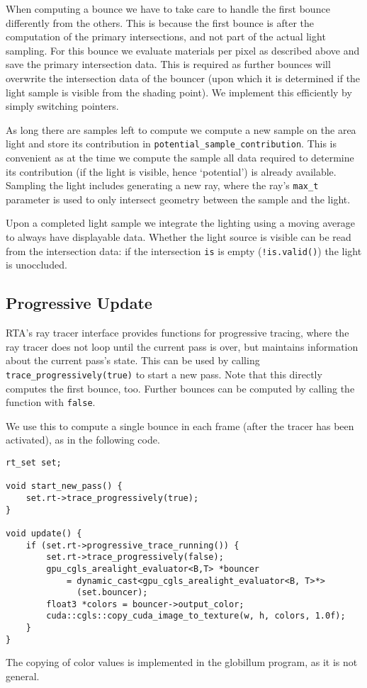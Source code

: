 \documentclass[a4paper,11pt]{scrartcl}
\begin{document}
When computing a bounce we have to take care to handle the first bounce differently from the others.
This is because the first bounce is after the computation of the primary intersections, and not part of the actual light sampling.
For this bounce we evaluate materials per pixel as described above and save the primary intersection data.
This is required as further bounces will overwrite the intersection data of the bouncer
	(upon which it is determined if the light sample is visible from the shading point).
We implement this efficiently by simply switching pointers.

As long there are samples left to compute we compute a new sample on the area light and store its contribution in 
	\lstinline|potential_sample_contribution|.
This is convenient as at the time we compute the sample all data required to determine its contribution (if the light is visible, hence `potential')
	is already available.
Sampling the light includes generating a new ray, 
	where the ray's \lstinline|max_t| parameter is used to only intersect geometry between the sample and the light.

Upon a completed light sample we integrate the lighting using a moving average to always have displayable data.
Whether the light source is visible can be read from the intersection data: if the intersection \lstinline|is| is empty (\lstinline|!is.valid()|)
	the light is unoccluded.

\subsection{Progressive Update}
RTA's ray tracer interface provides functions for progressive tracing, where the ray tracer does not loop until the current pass is over,
	but maintains information about the current pass's state.
This can be used by calling \lstinline|trace_progressively(true)| to start a new pass.
Note that this directly computes the first bounce, too.
Further bounces can be computed by calling the function with \lstinline|false|.

We use this to compute a single bounce in each frame (after the tracer has been activated), as in the following code.
\begin{lstlisting}
rt_set set;

void start_new_pass() {
	set.rt->trace_progressively(true);
}
	
void update() {
	if (set.rt->progressive_trace_running()) {
		set.rt->trace_progressively(false);
		gpu_cgls_arealight_evaluator<B,T> *bouncer 
			= dynamic_cast<gpu_cgls_arealight_evaluator<B, T>*>
			  (set.bouncer);
		float3 *colors = bouncer->output_color;
		cuda::cgls::copy_cuda_image_to_texture(w, h, colors, 1.0f);
	}
}
\end{lstlisting}
The copying of color values is implemented in the globillum program, as it is not general.
\end{document}
